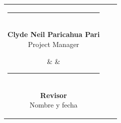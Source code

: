 \documentclass[11pt,a4paper]{article}
\begin{document}
\vspace{0.8cm}
\begin{center}
\begin{tabular}{c c c}
\parbox{6.5cm}{\centering \rule{6.0cm}{0.6pt}\\[5pt] \textbf{Clyde Neil Paricahua Pari}\\[2pt] {\footnotesize Project Manager}} & \hspace{0.8cm} & \parbox{6.5cm}{\centering \rule{6.0cm}{0.6pt}\\[5pt] \textbf{Revisor}\\[2pt] {\footnotesize Nombre y fecha}}
\end{tabular}
\end{center}
\end{document}
